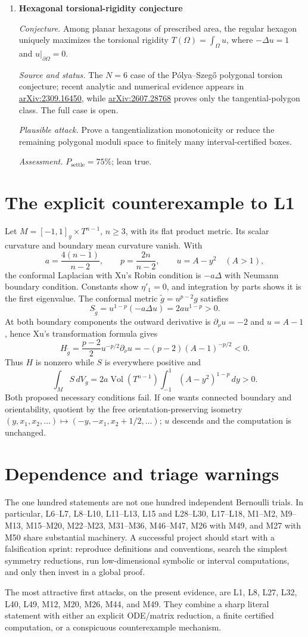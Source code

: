 \documentclass[11pt]{article}
\newcommand{\cand}[5]{%
  \item \textbf{#1}\par
  \emph{Conjecture.} #2\par
  \emph{Source and status.} #3\par
  \emph{Plausible attack.} #4\par
  \emph{Assessment.} #5
}
\newcommand{\psettle}{P_{\mathrm{settle}}}
\begin{document}
\begin{enumerate}[label=\textbf{M\arabic*.}]
\cand{Hexagonal torsional-rigidity conjecture}
{Among planar hexagons of prescribed area, the regular hexagon uniquely maximizes the torsional rigidity $T(\Omega)=\int_\Omega u$, where $-\Delta u=1$ and $u|_{\partial\Omega}=0$.}
{The $N=6$ case of the P\'olya--Szeg\H{o} polygonal torsion conjecture; recent analytic and numerical evidence appears in \href{https://arxiv.org/abs/2309.16450}{arXiv:2309.16450}, while \href{https://arxiv.org/html/2607.28768}{arXiv:2607.28768} proves only the tangential-polygon class.  The full case is open.}
{Prove a tangentialization monotonicity or reduce the remaining polygonal moduli space to finitely many interval-certified boxes.}
{$\psettle=75\%$; lean true.}

\end{enumerate}

\appendix
\section{The explicit counterexample to L1}\label{app:xu}

Let $M=[-1,1]_y\times T^{n-1}$, $n\ge3$, with its flat product metric.  Its scalar curvature and boundary mean curvature vanish.  With
\[a=\frac{4(n-1)}{n-2},\qquad p=\frac{2n}{n-2},\qquad u=A-y^2\quad(A>1),\]
the conformal Laplacian with Xu's Robin condition is $-a\Delta$ with Neumann boundary condition.  Constants show $\eta'_1=0$, and integration by parts shows it is the first eigenvalue.  The conformal metric $\widetilde g=u^{p-2}g$ satisfies
\[S_{\widetilde g}=u^{1-p}(-a\Delta u)=2a u^{1-p}>0.\]
At both boundary components the outward derivative is $\partial_\nu u=-2$ and $u=A-1$, hence Xu's transformation formula gives
\[H_{\widetilde g}=\frac{p-2}{2}u^{-p/2}\partial_\nu u
=-(p-2)(A-1)^{-p/2}<0.\]
Thus $H$ is nonzero while $S$ is everywhere positive and
\[\int_M S\,dV_g=2a\operatorname{Vol}(T^{n-1})\int_{-1}^{1}(A-y^2)^{1-p}\,dy>0.\]
Both proposed necessary conditions fail.  If one wants connected boundary and orientability, quotient by the free orientation-preserving isometry
$(y,x_1,x_2,\ldots)\mapsto(-y,-x_1,x_2+1/2,\ldots)$; $u$ descends and the computation is unchanged.

\section{Dependence and triage warnings}

The one hundred statements are not one hundred independent Bernoulli trials.  In particular, L6--L7, L8--L10, L11--L13, L15 and L28--L30, L17--L18, M1--M2, M9--M13, M15--M20, M22--M23, M31--M36, M46--M47, M26 with M49, and M27 with M50 share substantial machinery.  A successful project should start with a falsification sprint: reproduce definitions and conventions, search the simplest symmetry reductions, run low-dimensional symbolic or interval computations, and only then invest in a global proof.

The most attractive first attacks, on the present evidence, are L1, L8, L27, L32, L40, L49, M12, M20, M26, M44, and M49.  They combine a sharp literal statement with either an explicit ODE/matrix reduction, a finite certified computation, or a conspicuous counterexample mechanism.
\end{document}
